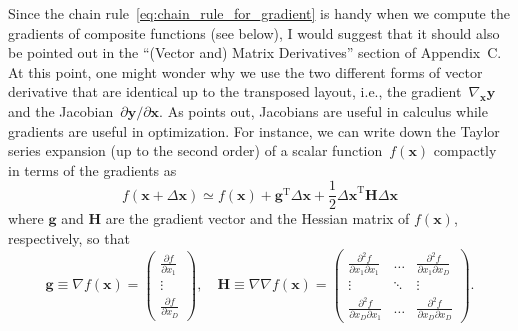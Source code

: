 \documentclass[12pt,a4paper]{article}
\begin{document}
Since the chain rule~\eqref{eq:chain_rule_for_gradient} is handy
when we compute the gradients of composite functions (see below),
I would suggest that it should also be pointed out in
the ``(Vector and) Matrix Derivatives'' section of Appendix~C.
At this point,
one might wonder why we use the two different forms of vector derivative that are identical
up to the transposed layout, i.e.,
the gradient~$\nabla_{\mathbf{x}} \mathbf{y}$ and
the Jacobian~$\partial\mathbf{y}/\partial\mathbf{x}$.
As \citet{Minka:OldNewMatrixAlgebra} points out,
Jacobians are useful in calculus while gradients are useful in optimization.
For instance, we can write down the Taylor series expansion
(up to the second order) of a scalar function~$f(\mathbf{x})$ compactly
in terms of the gradients as
\begin{equation}
f(\mathbf{x} + \Delta\mathbf{x}) \simeq
f(\mathbf{x})
+ \mathbf{g}^{\operatorname{T}} \Delta\mathbf{x}
+ \frac{1}{2} {\Delta\mathbf{x}}^{\operatorname{T}} \mathbf{H} \Delta\mathbf{x}
\end{equation}
where $\mathbf{g}$ and $\mathbf{H}$ are the gradient vector and the Hessian matrix of
$f(\mathbf{x})$, respectively, so that
\begin{equation}
\mathbf{g} \equiv \nabla f(\mathbf{x}) =
\begin{pmatrix}
\frac{\partial f}{\partial x_{1}} \\
\vdots \\
\frac{\partial f}{\partial x_{D}}
\end{pmatrix} , \quad
\mathbf{H} \equiv \nabla\nabla f(\mathbf{x}) =
\begin{pmatrix}
\frac{\partial^{2} f}{\partial x_{1} \partial x_{1}} &
\hdots &
\frac{\partial^{2} f}{\partial x_{1} \partial x_{D}} \\
\vdots & \ddots & \vdots \\
\frac{\partial^{2} f}{\partial x_{D} \partial x_{1}} &
\hdots &
\frac{\partial^{2} f}{\partial x_{D} \partial x_{D}}
\end{pmatrix} .
\end{equation}
\end{document}
